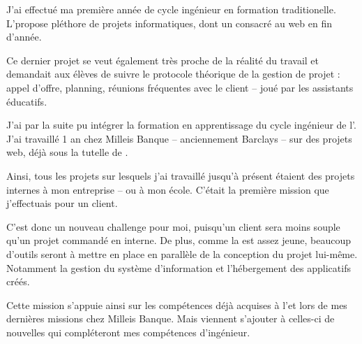 J'ai effectué ma première année de cycle ingénieur en formation traditionelle.\\ L'\epita propose pléthore de projets informatiques, dont un consacré au web en fin d'année.

Ce dernier projet se veut également très proche de la réalité du travail et demandait aux élèves de suivre le protocole théorique de la gestion de projet : appel d'offre, planning, réunions fréquentes avec le \og client \fg{} -- joué par les assistants éducatifs.

J'ai par la suite pu intégrer la formation en apprentissage du cycle ingénieur de l'\epita. J'ai travaillé 1 an chez Milleis Banque -- anciennement Barclays -- sur des projets web, déjà sous la tutelle de \damien.

Ainsi, tous les projets sur lesquels j'ai travaillé jusqu'à présent étaient des projets internes à mon entreprise -- ou à mon école.
C'était la première mission que j'effectuais pour un client.

C'est donc un nouveau challenge pour moi, puisqu'un client sera moins souple qu'un projet commandé en interne.
De plus, comme la \df est assez jeune, beaucoup d'outils seront à mettre en place en parallèle de la conception du projet lui-même. Notamment la gestion du système d'information et l'hébergement des applicatifs créés.

Cette mission s'appuie ainsi sur les compétences déjà acquises à l'\epita et lors de mes dernières missions chez Milleis Banque. Mais viennent s'ajouter à celles-ci de nouvelles qui compléteront mes compétences d'ingénieur.
